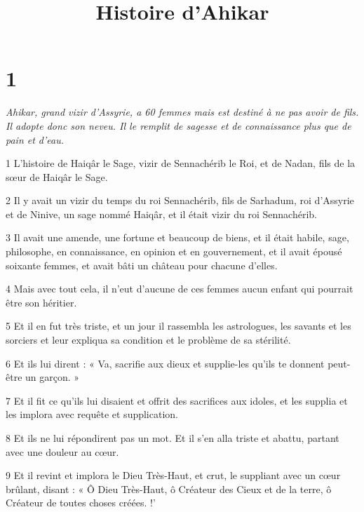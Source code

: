 

\title{Histoire d'Ahikar}

\chapter{1}

\par \textit{Ahikar, grand vizir d'Assyrie, a 60 femmes mais est destiné à ne pas avoir de fils. Il adopte donc son neveu. Il le remplit de sagesse et de connaissance plus que de pain et d'eau.}

\par 1 L'histoire de Haiqâr le Sage, vizir de Sennachérib le Roi, et de Nadan, fils de la sœur de Haiqâr le Sage.

\par 2 Il y avait un vizir du temps du roi Sennachérib, fils de Sarhadum, roi d'Assyrie et de Ninive, un sage nommé Haiqâr, et il était vizir du roi Sennachérib.

\par 3 Il avait une amende, une fortune et beaucoup de biens, et il était habile, sage, philosophe, en connaissance, en opinion et en gouvernement, et il avait épousé soixante femmes, et avait bâti un château pour chacune d'elles.

\par 4 Mais avec tout cela, il n’eut d’aucune de ces femmes aucun enfant qui pourrait être son héritier.

\par 5 Et il en fut très triste, et un jour il rassembla les astrologues, les savants et les sorciers et leur expliqua sa condition et le problème de sa stérilité.

\par 6 Et ils lui dirent : « Va, sacrifie aux dieux et supplie-les qu'ils te donnent peut-être un garçon. »

\par 7 Et il fit ce qu'ils lui disaient et offrit des sacrifices aux idoles, et les supplia et les implora avec requête et supplication.

\par 8 Et ils ne lui répondirent pas un mot. Et il s'en alla triste et abattu, partant avec une douleur au cœur.

\par 9 Et il revint et implora le Dieu Très-Haut, et crut, le suppliant avec un cœur brûlant, disant : « Ô Dieu Très-Haut, ô Créateur des Cieux et de la terre, ô Créateur de toutes choses créées. !'


